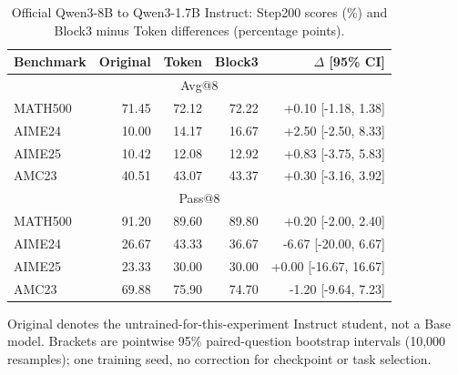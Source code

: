 \begin{table}[t]
\centering\small
\caption{Official Qwen3-8B to Qwen3-1.7B Instruct: Step200 scores (\%) and Block3 minus Token differences (percentage points).}
\label{tab:qwen17endpoint}
\begin{tabular}{lrrrr}
\toprule
Benchmark & Original & Token & Block3 & $\Delta$ [95\% CI] \\
\midrule
\multicolumn{5}{c}{Avg@8} \\
MATH500 & 71.45 & 72.12 & 72.22 & +0.10 [-1.18, 1.38] \\
AIME24 & 10.00 & 14.17 & 16.67 & +2.50 [-2.50, 8.33] \\
AIME25 & 10.42 & 12.08 & 12.92 & +0.83 [-3.75, 5.83] \\
AMC23 & 40.51 & 43.07 & 43.37 & +0.30 [-3.16, 3.92] \\
\midrule
\multicolumn{5}{c}{Pass@8} \\
MATH500 & 91.20 & 89.60 & 89.80 & +0.20 [-2.00, 2.40] \\
AIME24 & 26.67 & 43.33 & 36.67 & -6.67 [-20.00, 6.67] \\
AIME25 & 23.33 & 30.00 & 30.00 & +0.00 [-16.67, 16.67] \\
AMC23 & 69.88 & 75.90 & 74.70 & -1.20 [-9.64, 7.23] \\
\bottomrule
\end{tabular}
\par\smallskip\footnotesize Original denotes the untrained-for-this-experiment Instruct student, not a Base model. Brackets are pointwise 95\% paired-question bootstrap intervals (10,000 resamples); one training seed, no correction for checkpoint or task selection.
\end{table}
